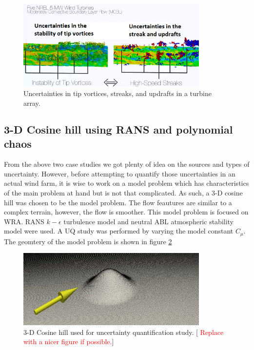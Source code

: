 \documentclass[]{aiaa-tc}%
\begin{document}
\begin{figure}
\centering
 \includegraphics[width=0.85\textwidth]{UQ2.png}
 \caption{Uncertainties in tip vortices, streaks, and updrafts in a turbine array.}
 \label{f:UQ2}
\end{figure}

\subsection{3-D Cosine hill using RANS and polynomial chaos} \label{cosineHill}
From the above two case studies we got plenty of idea on the sources and types of uncertainty. However, before attempting to quantify those uncertainties in an actual wind farm, it is wise to work on a model problem which has characteristics of the main problem at hand but is not that complicated. As such, a 3-D cosine hill was chosen to be the model problem. The flow feautures are similar to a complex terrain, however, the flow is smoother.  This model problem is focused on WRA.  RANS $k - \epsilon$  turbulence model and neutral ABL atmospheric stability model were used.
A UQ study was performed by varying the model constant $C_{\mu}$. The geomtery of the model problem is shown in figure \ref{f:cosine_hill}

\begin{figure}
\centering
 \includegraphics[width=0.85\textwidth]{CosineHill.png}
 \caption{3-D Cosine hill used for uncertainty quantification study. [\textcolor{red}{ Replace with a nicer figure if possible.}] }
 \label{f:cosine_hill}
\end{figure}
\end{document}

